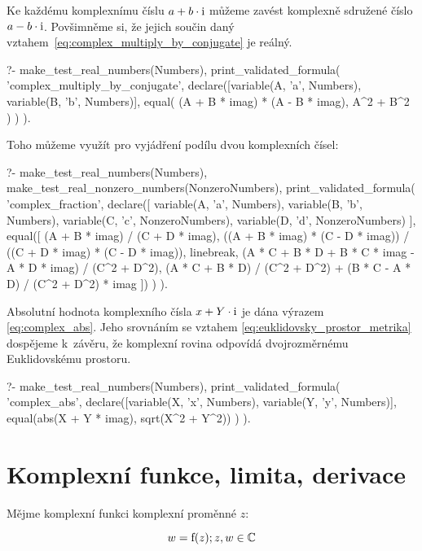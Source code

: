 Ke každému komplexnímu číslu \(a + b \cdot \mathrm{i}\) můžeme zavést komplexně sdružené číslo \(a - b \cdot \mathrm{i}\). Povšimněme si, že jejich součin daný vztahem~\eqref{eq:complex_multiply_by_conjugate} je reálný.

\begin{prolog}
?-	make_test_real_numbers(Numbers),
	print_validated_formula(
		'complex_multiply_by_conjugate',
		declare([variable(A, 'a', Numbers), variable(B, 'b', Numbers)],
			equal(
				(A + B * imag) * (A - B * imag),
				A^2 + B^2
			)
		)
	).
\end{prolog}

Toho můžeme využít pro vyjádření podílu dvou komplexních čísel:

\begin{prolog}
?-	make_test_real_numbers(Numbers),
	make_test_real_nonzero_numbers(NonzeroNumbers),
	print_validated_formula(
		'complex_fraction',
		declare([
			variable(A, 'a', Numbers), variable(B, 'b', Numbers),
			variable(C, 'c', NonzeroNumbers), variable(D, 'd', NonzeroNumbers)
		],
			equal([
				(A + B * imag) / (C + D * imag),
				((A + B * imag) * (C - D * imag)) / ((C + D * imag) * (C - D * imag)),
				linebreak,
				(A * C + B * D + B * C * imag - A * D * imag) / (C^2 + D^2),
				(A * C + B * D) / (C^2 + D^2) + (B * C - A * D) / (C^2 + D^2) * imag
			])
		)
	).
\end{prolog}

Absolutní hodnota komplexního čísla \(x + Y \cdot \mathrm{i}\) je dána výrazem \eqref{eq:complex_abs}. Jeho srovnáním se vztahem \eqref{eq:euklidovsky_prostor_metrika} dospějeme k~závěru, že komplexní rovina odpovídá dvojrozměrnému Euklidovskému prostoru.

\begin{prolog}
?-	make_test_real_numbers(Numbers),
	print_validated_formula(
		'complex_abs',
		declare([variable(X, 'x', Numbers), variable(Y, 'y', Numbers)],
			equal(abs(X + Y * imag), sqrt(X^2 + Y^2))
		)
	).
\end{prolog}

\section{Komplexní funkce, limita, derivace}

Mějme komplexní funkci komplexní proměnné \(z\):

\begin{equation}
w = \mathrm{f}(z); z, w \in \mathbb{C}
\end{equation}


